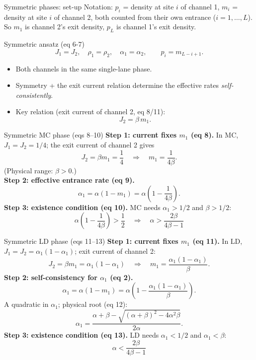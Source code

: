 \documentclass[aspectratio=169,10pt]{beamer}
\begin{document}
\begin{frame}{Symmetric phases: set-up}
  \small
  Notation: $p_i$ = density at site $i$ of channel 1, $m_i$ = density at site
  $i$ of channel 2, both counted from their own entrance ($i=1,\dots,L$).
  So $m_1$ is channel 2's exit density, $p_L$ is channel 1's exit density.
  \begin{block}{Symmetric ansatz (eq 6-7)}
    \[
      J_1 = J_2, \quad \rho_1 = \rho_2, \quad \alpha_1 = \alpha_2, \qquad
      p_i = m_{L-i+1}.
    \]
  \end{block}
  \begin{itemize}
    \item Both channels in the same single-lane phase.
    \item Symmetry + the exit current relation determine the effective rates
      \emph{self-consistently}.
    \item Key relation (exit current of channel 2, eq 8/11):
      \[
        J_2 = \beta\, m_1 .
      \]
  \end{itemize}
\end{frame}

\begin{frame}{Symmetric MC phase (eqs 8--10)}
  \footnotesize
  \textbf{Step 1: current fixes $m_1$ (eq 8).}
  In MC, $J_1 = J_2 = 1/4$; the exit current of channel 2 gives
  \[
    J_2 = \beta m_1 = \frac14 \quad\Rightarrow\quad m_1 = \frac{1}{4\beta}.
  \]
  (Physical range: $\beta > 0$.)\\
  \textbf{Step 2: effective entrance rate (eq 9).}
  \[
    \alpha_1 = \alpha(1 - m_1) = \alpha\left(1 - \frac{1}{4\beta}\right).
  \]
  \textbf{Step 3: existence condition (eq 10).}
  MC needs $\alpha_1 > 1/2$ and $\beta > 1/2$:
  \[
    \alpha\left(1 - \frac{1}{4\beta}\right) > \frac12
    \quad\Longrightarrow\quad
    \alpha > \frac{2\beta}{4\beta - 1}
  \]
\end{frame}

\begin{frame}{Symmetric LD phase (eqs 11--13)}
  \footnotesize
  \textbf{Step 1: current fixes $m_1$ (eq 11).}
  In LD, $J_1 = J_2 = \alpha_1(1-\alpha_1)$; exit current of channel 2:
  \[
    J_2 = \beta m_1 = \alpha_1(1-\alpha_1)
    \quad\Rightarrow\quad
    m_1 = \frac{\alpha_1(1-\alpha_1)}{\beta}.
  \]
  \textbf{Step 2: self-consistency for $\alpha_1$ (eq 2).}
  \[
    \alpha_1 = \alpha(1 - m_1)
    = \alpha\left(1 - \frac{\alpha_1(1-\alpha_1)}{\beta}\right).
  \]
  A quadratic in $\alpha_1$; physical root (eq 12):
  \[
    \alpha_1 = \frac{\alpha + \beta - \sqrt{(\alpha+\beta)^2 - 4\alpha^2\beta}}{2\alpha}.
  \]
  \textbf{Step 3: existence condition (eq 13).}
  LD needs $\alpha_1 < 1/2$ and $\alpha_1 < \beta$:
  \[
    \alpha < \frac{2\beta}{4\beta - 1}
  \]
\end{frame}
\end{document}
